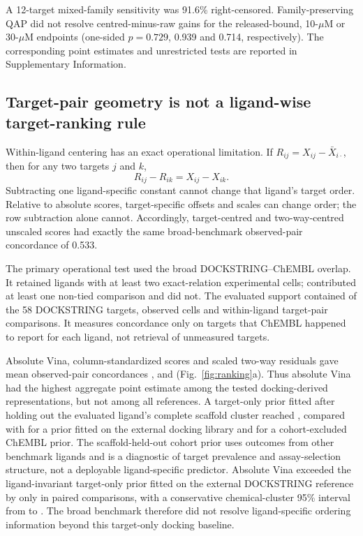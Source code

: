 \documentclass[11pt]{article}
\begin{document}
A 12-target mixed-family sensitivity was 91.6\% right-censored. Family-preserving QAP did
not resolve centred-minus-raw gains for the released-bound, 10-$\mu$M or 30-$\mu$M
endpoints (one-sided $p=0.729$, 0.939 and 0.714, respectively). The corresponding point
estimates and unrestricted tests are reported in Supplementary Information.

\subsection{Target-pair geometry is not a ligand-wise target-ranking rule}

Within-ligand centering has an exact operational limitation. If
$R_{ij}=X_{ij}-\bar X_{i\cdot}$, then for any two targets $j$ and $k$,
\begin{equation}
R_{ij}-R_{ik}=X_{ij}-X_{ik}.
\label{eq:rankinvariance}
\end{equation}
Subtracting one ligand-specific constant cannot change that ligand's target order. Relative
to absolute scores, target-specific offsets and scales can change order; the row subtraction
alone cannot. Accordingly, target-centred and two-way-centred unscaled scores had exactly
the same broad-benchmark observed-pair concordance of 0.533.

The primary operational test used the broad DOCKSTRING--ChEMBL overlap. It retained
\BroadRankingRetainedLigands{} ligands with at least two exact-relation experimental cells;
\BroadRankingEvaluatedLigands{} contributed at least one non-tied comparison and
\BroadRankingUninformativeLigands{} did not. The evaluated support contained
\BroadRankingTargets{} of the 58 DOCKSTRING targets, \BroadRankingCells{} observed cells and
\BroadRankingPairs{} within-ligand target-pair comparisons. It measures concordance only on
targets that ChEMBL happened to report for each ligand, not retrieval of unmeasured targets.

Absolute Vina, column-standardized scores and scaled two-way residuals gave mean
observed-pair concordances \BroadRankingAbsolute{}, \BroadRankingColumn{} and
\BroadRankingResidual{} (Fig.~\ref{fig:ranking}a). Thus absolute Vina had the highest
aggregate point estimate among the tested docking-derived representations, but not among all
references. A target-only
prior fitted after holding out the evaluated ligand's complete scaffold cluster reached
\BroadRankingCohortPrior{}, compared with \BroadRankingDockingPrior{} for a prior fitted on
the external docking library and \BroadRankingExternalPrior{} for a cohort-excluded ChEMBL
prior. The scaffold-held-out cohort prior uses outcomes from other benchmark ligands and is
a diagnostic of target prevalence and assay-selection structure, not a deployable
ligand-specific predictor. Absolute Vina exceeded the ligand-invariant target-only prior
fitted on the external DOCKSTRING reference by only
\BroadRankingAbsoluteMinusDockingPrior{} in paired comparisons, with a
conservative chemical-cluster 95\% interval from
\BroadRankingAbsoluteMinusDockingPriorLow{} to
\BroadRankingAbsoluteMinusDockingPriorHigh{}. The broad benchmark therefore did not resolve
ligand-specific ordering information beyond this target-only docking baseline.
\end{document}
